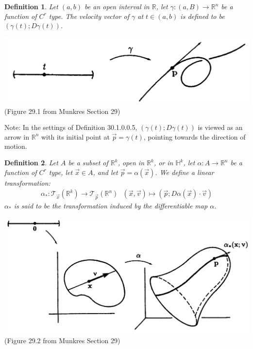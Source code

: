 \documentclass[11pt,oneside]{book}
\theoremstyle{break}
\theoremstyle{break}
\newtheorem{defn}{Definition}[corL]
\newcommand{\R}{\mathbb{R}}
\newcommand{\T}{\mathcal{T}}
\newcommand{\note}{\color{red}Note: \color{black}}
\begin{document}
\begin{defn}
Let $(a,b)$ be an open interval in $\R$, let $\gamma:(a,B) \to \R^n$ be a function of $C^r$ type. The velocity vector of $\gamma$ at $t \in (a,b)$ is defined to be $(\gamma(t); D\gamma(t))$. 
\end{defn}

\begin{center}
\includegraphics[scale=0.3]{1tangent.png}\\
(Figure 29.1 from Munkres Section 29)
\end{center}

\note In the settings of Definition 30.1.0.0.5, $(\gamma(t); D\gamma(t))$ is viewed as an arrow in $\R^n$ with its initial point at $\vec{p} = \gamma(t)$, pointing towards the direction of motion. \\

\begin{defn}
Let $A$ be a subset of $\R^k$, open in $\R^k$, or in $\mathbb{H}^k$, let $\alpha:A \to \R^n$ be a function of $C^r$ type, let $\vec{x} \in A$, and let $\vec{p} = \alpha(\vec{x})$. We define a linear transformation:
\begin{align*}
\alpha_*: \T_{\vec{x}}(\R^k) \to \T_{\vec{p}}(\R^n) \ \ \ (\vec{x},\vec{v})\mapsto (\vec{p}; D\alpha(\vec{x})\cdot \vec{v})
\end{align*}
$\alpha_*$ is said to be the transformation induced by the differentiable map $\alpha$. 
\end{defn}

\begin{center}
\includegraphics[scale=0.29]{ntangent.png}\\
(Figure 29.2 from Munkres Section 29)
\end{center}
\end{document}
